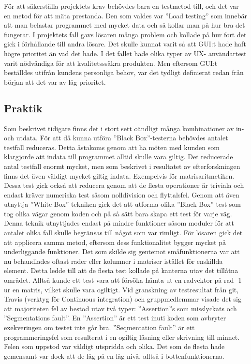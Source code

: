 För att säkerställa projektets krav behövdes bara en testmetod till, och det var en metod för att mäta prestanda. Den som valdes var ''Load testing'' som innebär att man belastar programmet med mycket data och så kollar man på hur bra det fungerar. I projektets fall gavs lösaren många problem och kollade på hur fort det gick i förhållande till andra lösare. \newline	
Det skulle kunnat varit så att GUI:t hade haft högre prioritet än vad det hade. I det fallet hade olika typer av UX- användartest varit nödvändiga för att kvalitetsssäkra produkten. Men eftersom GUI:t beställdes utifrån kundens personliga behov, var det tydligt definierat redan från början att det var av låg prioritet. 
	
	\subsection{Praktik}
	Som beskrivet tidigare finns det i stort sett oändligt många kombinationer av in- och utdata.	För att då kunna utföra ''Black Box''-testerna behövdes antalet testfall reduceras. Detta åstakoms genom att ha möten med kunden som klargjorde att indata till programmet alltid skulle vara giltig. Det reducerade antal testfall enormt mycket, men som beskrivet i resultatet av efterforskningen finns det även väldigt mycket giltig indata. Exempelvis för matrisaritmetiken. Dessa test gick också att reducera genom att de flesta operationer är triviala och endast kräver numeriska test såsom nolldivision och flyttalsfel. Genom att även utnyttja ''White Box''-tekniken gick det att utforma olika ''Black Box''-test som tog olika vägar genom koden och på så sätt bara skapa ett test för varje väg. Denna teknik utnyttjades endast på mindre funktioner såsom moduler för att antalet olika fall skulle begränsas till något som var rimligt. \newline
	För lösaren gick det att applicera samma metod, eftersom dess funktionalitet bygger mycket på underliggande funktioner. Det som skilde sig gentemot småfunktionerna var att nu behandlades oftast rader eller kolumner i matriser istället för enskillda element. Detta ledde till att de flesta test kollade på kanterna utav det tillåtna området. Alltså kunde ett test vara att försöka hämta ut en radvektor på rad -1 ur en matris, vilket skulle vara ogiltigt.\newline
Vid granskning av testresultat från git, Travis (verktyg för Continuous integration) och gruppmedlemmar visade det sig att majoriteten fel av bestod utav två typer: ''Assertion''s som misslyckats och ''Segmentations fault''. En ''Assertion'' är ett test inuti koden som avbryter exekveringen om testet inte går bra. ''Seqmentation fault'' är ett programmeringsfel som resulterat i en ogiltig läsning eller skrivning till minnet. Felen som uppstod var väldigt utspridda och olika. Det som de flesta hade gemensamt var dock att de låg på en låg nivå, alltså i bottenfunktionerna. \newline	
